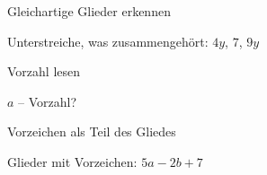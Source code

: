 \setcounter{aufgabe}{10}

\begin{aufgabe}{Gleichartige Glieder erkennen}
\begin{teile}
\teil Unterstreiche, was zusammengehört: $4y$, $7$, $9y$
\end{teile}
\end{aufgabe}

\begin{aufgabe}{Vorzahl lesen}
\begin{teile}
\teil $a$ – Vorzahl?
\end{teile}
\end{aufgabe}

\begin{aufgabe}{Vorzeichen als Teil des Gliedes}
\begin{teile}
\teil Glieder mit Vorzeichen: $5a - 2b + 7$
\end{teile}
\end{aufgabe}

